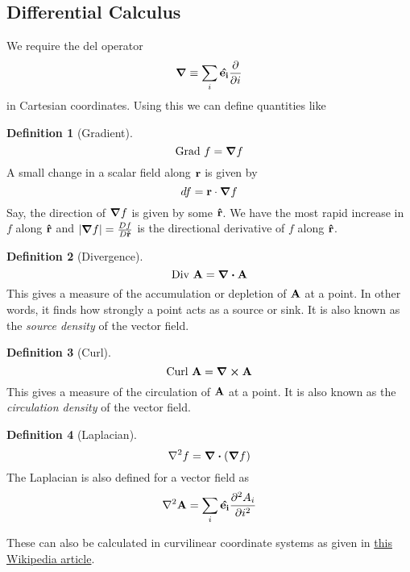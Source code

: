 \documentclass[10pt, a4paper]{extarticle}
\theoremstyle{definition}
\newtheorem{defn}{Definition}
\begin{document}
\subsection{Differential Calculus}
We require the del operator
\[\grad\equiv \sum_i\vu{e_i}\pdv{}{i}\] in Cartesian coordinates. Using this we can define quantities like
\begin{framed}
	\begin{defn}[Gradient]
		\[\text{Grad }f=\grad f\]
		A small change in a scalar field along $\vb{r}$ is given by
		\[df=\vb{r}\cdot\grad f\]
		Say, the direction of $\grad f$ is given by some $\vu{r}$. We have the most rapid increase in $f$ along $\vu{r}$ and $|\grad f|=\frac{Df}{D\vu{r}}$ is the directional derivative of $f$ along $\vu{r}$.
	\end{defn}

	\begin{defn}[Divergence]
		\[\text{Div }\vb{A}=\div\vb{A}\]
		This gives a measure of the accumulation or depletion of $\vb{A}$ at a point. In other words, it finds how strongly a point acts as a source or sink. It is also known as the \emph{source density} of the vector field.
	\end{defn}

	\begin{defn}[Curl]
		\[\text{Curl }\vb{A}=\curl\vb{A}\]
		This gives a measure of the circulation of $\vb{A}$ at a point. It is also known as the \emph{circulation density} of the vector field.
	\end{defn}

	\begin{defn}[Laplacian]
		\[\laplacian f=\div(\grad f)\]
		The Laplacian is also defined for a vector field as
		\[\laplacian\vb{A}=\sum_i \vu{e_i}\pdv[2]{A_i}{i}\]
	\end{defn}
\end{framed}
These can also be calculated in curvilinear coordinate systems as given in \href{https://en.wikipedia.org/wiki/Del_in_cylindrical_and_spherical_coordinates}{this Wikipedia article}.
\end{document}
